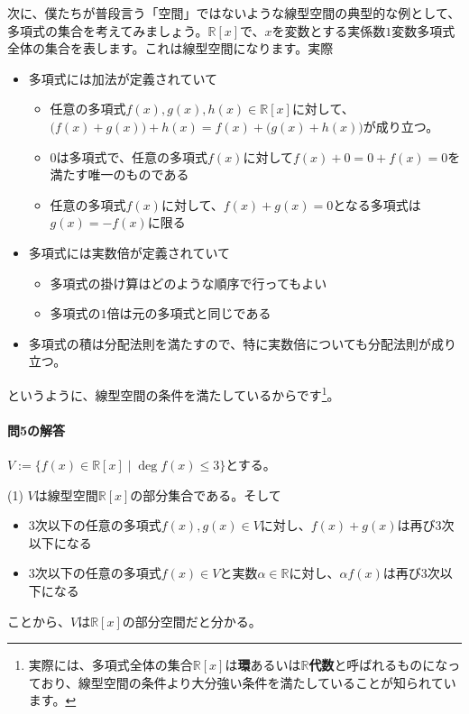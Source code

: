 次に、僕たちが普段言う「空間」ではないような線型空間の典型的な例として、多項式の集合を考えてみましょう。$\mathbb{R}[x]$で、$x$を変数とする実係数$1$変数多項式全体の集合を表します。これは線型空間になります。実際
\begin{itemize}
\item 多項式には加法が定義されていて
\begin{itemize}
\item 任意の多項式$f(x), g(x), h(x)\in\mathbb{R}[x]$に対して、$\bigl(f(x) + g(x)\bigr) + h(x) = f(x) + \bigl(g(x) + h(x)\bigr)$が成り立つ。
\item $0$は多項式で、任意の多項式$f(x)$に対して$f(x) + 0 = 0 + f(x) = 0$を満たす唯一のものである
\item 任意の多項式$f(x)$に対して、$f(x) + g(x) = 0$となる多項式は$g(x) = -f(x)$に限る
\end{itemize}
\item 多項式には実数倍が定義されていて
\begin{itemize}
\item 多項式の掛け算はどのような順序で行ってもよい
\item 多項式の$1$倍は元の多項式と同じである
\end{itemize}
\item 多項式の積は分配法則を満たすので、特に実数倍についても分配法則が成り立つ。
\end{itemize}
というように、線型空間の条件を満たしているからです\footnote{実際には、多項式全体の集合$\mathbb{R}[x]$は\textbf{環}あるいは\textbf{$\mathbb{R}$代数}と呼ばれるものになっており、線型空間の条件より大分強い条件を満たしていることが知られています。}。

\paragraph{問5の解答}
$V:= \{f(x)\in\mathbb{R}[x] \mid \deg f(x) \leq 3\}$とする。

\noindent (1) $V$は線型空間$\mathbb{R}[x]$の部分集合である。そして
\begin{itemize}
\item $3$次以下の任意の多項式$f(x), g(x)\in V$に対し、$f(x) + g(x)$は再び$3$次以下になる
\item $3$次以下の任意の多項式$f(x) \in V$と実数$\alpha \in\mathbb{R}$に対し、$\alpha f(x)$は再び$3$次以下になる
\end{itemize}
ことから、$V$は$\mathbb{R}[x]$の部分空間だと分かる。

